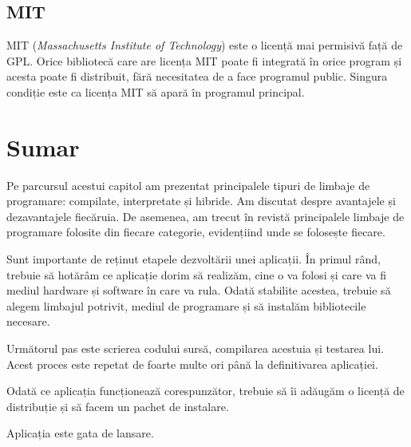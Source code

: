 \subsection{MIT}
\label{sec:appdev-licensing-mit}

MIT  (\textit{Massachusetts Institute of Technology}) este o licență mai
permisivă față de GPL. Orice bibliotecă care are licența MIT poate fi integrată
în orice program și acesta poate fi distribuit, fără necesitatea de a face
programul public. Singura condiție este ca licența MIT să apară în programul
principal.

\section{Sumar}
\label{sec:appdev-summary}

Pe parcursul acestui capitol am prezentat principalele tipuri de limbaje de
programare: compilate, interpretate și hibride. Am discutat despre avantajele și
dezavantajele fiecăruia. De asemenea, am trecut în revistă principalele limbaje
de programare folosite din fiecare categorie, evidențiind unde se folosește
fiecare.

Sunt importante de reținut etapele dezvoltării unei aplicații. În primul rând,
trebuie să hotărâm ce aplicație dorim să realizăm, cine o va folosi și care va
fi mediul hardware și software în care va rula. Odată stabilite acestea, trebuie
să alegem limbajul potrivit, mediul de programare și să instalăm bibliotecile
necesare.

Următorul pas este scrierea codului sursă, compilarea acestuia și testarea lui.
Acest proces este repetat de foarte multe ori până la definitivarea aplicației.

Odată ce aplicația funcționează corespunzător, trebuie să îi adăugăm o licență
de distribuție și să facem un pachet de instalare.

Aplicația este gata de lansare.
